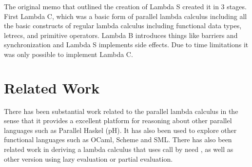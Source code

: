 \documentclass[preprint, 10pt]{sigplanconf}
\begin{document}
The original memo that outlined the creation of Lambda S created it in 3 stages. First Lambda C, which was a basic form of parallel lambda calculus including all the basic constructs of regular lambda calculus including functional data types, letrecs, and primitive operators. Lambda B introduces things like barriers and synchronization and Lambda S implements side effects.  Due to time limitations it was only possible to implement Lambda C. 

\section{Related Work}
There has been substantial work related to the parallel lambda calculus in the sense that it provides a excellent platform for reasoning about other parallel languages such as Parallel Haskel (pH).\cite{pH} It has also been used to explore other functional languages such as OCaml, Scheme and SML. There has also been related work in deriving a lambda calculus that uses call by need \citep{callByNeed}, as well as other version using lazy evaluation or partial evaluation.  
\end{document}
